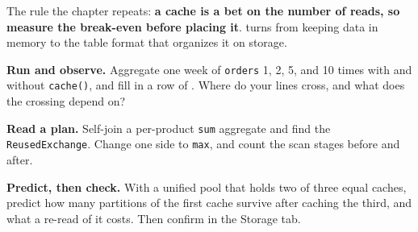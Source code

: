The rule the chapter repeats: \textbf{a cache is a bet on the number of reads, so
measure the break-even before placing it}.  turns from
keeping data in memory to the table format that organizes it on storage.

\exercisehead
\begin{exercises}
\item \textbf{Run and observe.} Aggregate one week of \texttt{orders} 1, 2, 5,
      and 10 times with and without \texttt{cache()}, and fill in a row of
      . Where do your lines cross, and what does
      the crossing depend on?
\item \textbf{Read a plan.} Self-join a per-product \texttt{sum} aggregate and find
      the \texttt{ReusedExchange}. Change one side to \texttt{max}, and count the
      scan stages before and after.
\item \textbf{Predict, then check.} With a unified pool that holds two of three
      equal caches, predict how many partitions of the first cache survive after
      caching the third, and what a re-read of it costs. Then confirm in the
      Storage tab.
\end{exercises}
